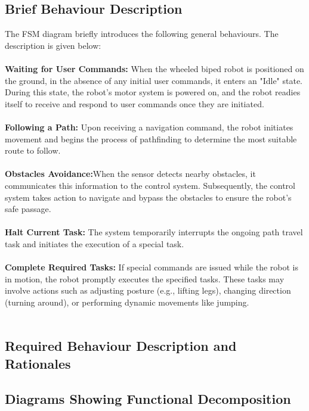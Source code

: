 \documentclass[12pt]{article}
\begin{document}
\subsection{Brief Behaviour Description}
The FSM diagram briefly introduces the following general behaviours. The description is given below:\\\\
\noindent\textbf{Waiting for User Commands:} When the wheeled biped robot is positioned on the ground, in the absence of any initial user commands, it enters an "Idle" state. During this state, the robot's motor system is powered on, and the robot readies itself to receive and respond to user commands once they are initiated. \\\\
\noindent\textbf{Following a Path:} Upon receiving a navigation command, the robot initiates movement and begins the process of pathfinding to determine the most suitable route to follow.\\\\
\textbf{Obstacles Avoidance:}When the sensor detects nearby obstacles, it communicates this information to the control system. Subsequently, the control system takes action to navigate and bypass the obstacles to ensure the robot's safe passage.   \\\\
\textbf{Halt Current Task:} The system temporarily interrupts the ongoing path travel task and initiates the execution of a special task.\\\\
\textbf{Complete Required Tasks:} If special commands are issued while the robot is in motion, the robot promptly executes the specified tasks. These tasks may involve actions such as adjusting posture (e.g., lifting legs), changing direction (turning around), or performing dynamic movements like jumping. \\\\


\subsection{Required Behaviour Description and Rationales}
\subsection{Diagrams Showing Functional Decomposition}


\end{document}

